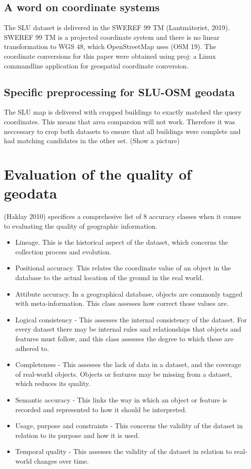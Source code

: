 \documentclass[a4paper]{article}
\begin{document}
\subsection{A word on coordinate systems}

The SLU dataset is delivered in the SWEREF 99 TM (Lantmäteriet, 2019). SWEREF 99 TM is a projected coordinate system and there is no linear transformation to WGS 48, which OpenStreetMap uses (OSM 19). The coordinate conversions for this paper were obtained using proj: a Linux commandline application for geospatial coordinate conversion.

\subsection{Specific preprocessing for SLU-OSM geodata}

The SLU map is delivered with cropped buildings to exactly matched the query coordinates. This means that area comparsion will not work.
Therefore it was neccessary to crop both datasets to ensure that all buildings were complete and had matching candidates in the other set.
(Show a picture)

\section{Evaluation of the quality of geodata}

(Haklay 2010) specifices a comprehesive list of 8 accuracy classes when it comes to evaluating the quality of geographic information.

\begin{itemize}
  \item Lineage. This is the historical aspect of the dataset, which concerns the collection process and evolution.
  \item Positional accuracy. This relates the coordinate value of an object in the database to the actual location of the ground in the real world.
  \item Attibute accuracy. In a geographical database, objects are commonly tagged with meta-information. This class assesses how correct those values are.
  \item Logical consistency - This assesses the internal consistency of the dataset. For every dataset there may be internal rules and relationships that objects and features must follow, and this class assesses the degree to which these are adhered to.
  \item Completeness - This assesses the lack of data in a dataset, and the coverage of real-world objects. Objects or features may be missing from a dataset, which reduces its quality.
  \item Semantic accuracy - This links the way in which an object or feature is recorded and represented to how it should be interpreted.
  \item Usage, purpose and constraints - This concerns the validity of the dataset in relation to its purpose and how it is used.
  \item Temporal quality - This assesses the validity of the dataset in relation to real-world changes over time.
\end{itemize}
\end{document}
